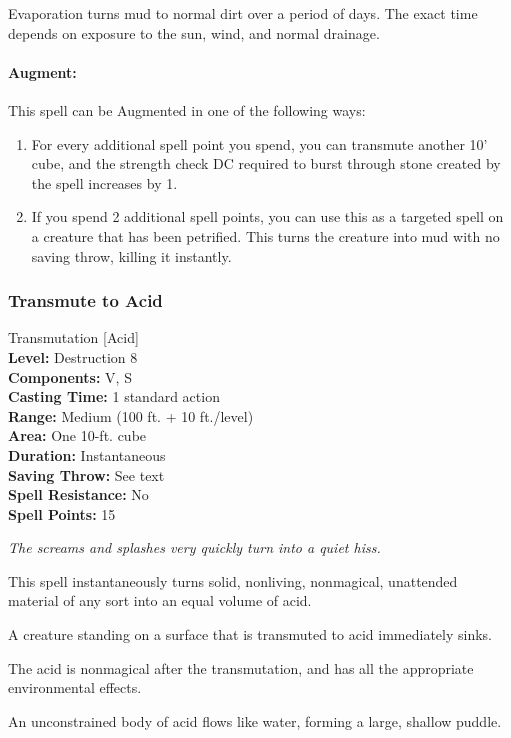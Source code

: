 Evaporation turns mud to normal dirt over a period of days. The exact time depends on exposure to the sun, wind, and normal drainage.

\paragraph{Augment:} This spell can be Augmented in one of the following ways:
\begin{enumerate}
 \item For every additional spell point you spend, you can transmute another 10' cube, 
and the strength check DC required to burst through stone created by the spell increases by 1.
 \item If you spend 2 additional spell points, you can use this as a targeted spell on a creature that has been petrified.
 This turns the creature into mud with no saving throw, killing it instantly.
\end{enumerate}
\subsubsection{Transmute to Acid}
\label{Spell:TransmuteToAcid}
Transmutation [Acid]
\\ \textbf{Level:} Destruction 8
\\ \textbf{Components:} V, S
\\ \textbf{Casting Time:} 1 standard action
\\ \textbf{Range:} Medium (100 ft. + 10 ft./level)
\\ \textbf{Area:} One 10-ft. cube
\\ \textbf{Duration:} Instantaneous
\\ \textbf{Saving Throw:} See text
\\ \textbf{Spell Resistance:} No
\\ \textbf{Spell Points:} 15

\emph{The screams and splashes very quickly turn into a quiet hiss.}

This spell instantaneously turns solid, nonliving, nonmagical, unattended material of any sort into an equal volume of acid.

A creature standing on a surface that is transmuted to acid immediately sinks.

The acid is nonmagical after the transmutation, and has all the appropriate environmental effects.

An unconstrained body of acid flows like water, forming a large, shallow puddle.

